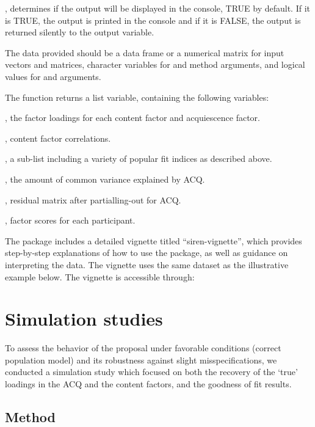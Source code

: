 , determines if the output will be displayed in the console, TRUE by default. If it is TRUE, the output is printed in the console and if it is FALSE, the output is returned silently to the output variable.

The data provided should be a data frame or a numerical matrix for input vectors and matrices, character variables for  and method arguments, and logical values for  and  arguments.

The  function returns a list variable, containing the following variables:

, the factor loadings for each content factor and acquiescence factor.

, content factor correlations.

, a sub-list including a variety of popular fit indices as described above.

, the amount of common variance explained by ACQ.

, residual matrix after partialling-out for ACQ.

, factor scores for each participant.

The package includes a detailed vignette titled “siren-vignette”, which provides step-by-step explanations of how to use the package, as well as guidance on interpreting the data. The vignette uses the same dataset as the illustrative example below.
The vignette is accessible through:


\section{Simulation studies}

To assess the behavior of the proposal under favorable conditions (correct population model) and its robustness against slight misspecifications, we conducted a simulation study which focused on both the recovery of the ‘true’ loadings in the ACQ and the content factors, and the goodness of fit results.

\subsection{Method}

